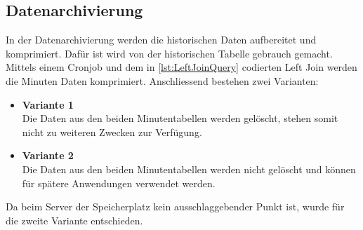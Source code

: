 \subsection{Datenarchivierung}

In der Datenarchivierung werden die historischen Daten aufbereitet und komprimiert. Dafür ist wird von der historischen Tabelle gebrauch gemacht. Mittels einem Cronjob und dem in \ref{lst:LeftJoinQuery} codierten Left Join werden die Minuten Daten komprimiert. Anschliessend bestehen zwei Varianten:\\
\begin{itemize}
\item \textbf{Variante 1}\\
Die Daten aus den beiden Minutentabellen werden gelöscht, stehen somit nicht zu weiteren Zwecken zur Verfügung.
\item \textbf{Variante 2}\\
Die Daten aus den beiden Minutentabellen werden nicht gelöscht und können für spätere Anwendungen verwendet werden.
\end{itemize}

Da beim Server der Speicherplatz kein ausschlaggebender Punkt ist, wurde für die zweite Variante entschieden.


